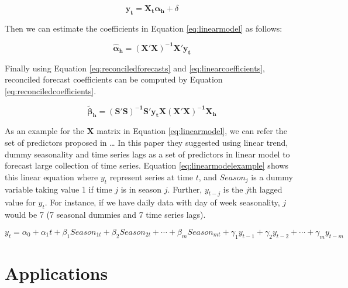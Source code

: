 \documentclass[11pt,a4paper,]{article}
\begin{document}
\begin{equation}\label{eq:linearmodel}
   \mathbf{y_t} = \mathbf{X_t} \boldsymbol{\alpha_h}+\delta 
\end{equation}

Then we can estimate the coefficients in Equation \eqref{eq:linearmodel}
as follows:

\begin{equation}\label{eq:linearcoefficients}
   \boldsymbol{\hat{\alpha}_h} = \mathbf{(X'X)^{-1}X'}\mathbf{y_t}
\end{equation}

Finally using Equation \eqref{eq:reconciledforecasts} and
\eqref{eq:linearcoefficients}, reconciled forecast coefficients can be
computed by Equation \eqref{eq:reconciledcoefficients}.

\begin{equation}\label{eq:reconciledcoefficients}
   \boldsymbol{\tilde{\beta}_h} = \mathbf{(S'S)^{-1}S'}\mathbf{y_t}\mathbf{X(X'X)^{-1}}\mathbf{X_h}
\end{equation}

As an example for the \(\mathbf{X}\) matrix in Equation
\eqref{eq:linearmodel}, we can refer the set of predictors proposed in
\textcite{Ashourietal}\ldots{} In this paper they suggested using linear
trend, dummy seasonality and time series lags as a set of predictors in
linear model to forecast large collection of time series. Equation
\eqref{eq:linearmodelexample} shows this linear equation where \(y_t\)
represent series at time \(t\), and \(Season_j\) is a dummy variable
taking value 1 if time \(j\) is in season \(j\). Further, \(y_{t-j}\) is
the \(j\)th lagged value for \(y_t\). For instance, if we have daily
data with day of week seasonality, \(j\) would be 7 (7 seasonal dummies
and 7 time series lags).

\begin{equation}\label{eq:linearmodelexample}
   y_t = \alpha_0 + \alpha_1 t + \beta_1 Season_{1t} + \beta_2 Season_{2t} + \cdots + \beta_m Season_{mt} + \gamma_1 y_{t-1} + \gamma_2 y_{t-2} + \cdots + \gamma_m y_{t-m} 
\end{equation}

\section{Applications}\label{applications}
\end{document}
